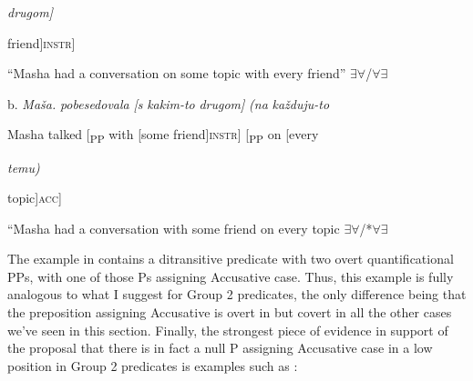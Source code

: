 \documentclass[output=paper,modfonts, nonflat]{langsci/langscibook}
\begin{document}
\begin{styleinnerExample}
\begin{styleinnerExample}
    \textit{drugom]}
\end{styleinnerExample}

\begin{styleinnerExample}
    friend]\textsc{instr}]
\end{styleinnerExample}

\begin{styleinnerExample}
    “Masha had a conversation on some topic with every friend” ${\exists}{\forall}$/${\forall}{\exists}$
\end{styleinnerExample}

\begin{styleinnerExample}
  b.  \textit{Maša.}  \textit{pobesedovala} \textit{[s}       \textit{kakim-to} \textit{drugom]}            \textit{(na} \textit{každuju-to} 
\end{styleinnerExample}

\begin{styleinnerExample}
    Masha talked         [\textsubscript{PP} with [some      friend]\textsc{instr}] [\textsubscript{PP} on [every 
\end{styleinnerExample}

\begin{styleinnerExample}
    \textit{temu)}
\end{styleinnerExample}

\begin{styleinnerExample}
    topic]\textsc{acc}]
\end{styleinnerExample}

\begin{styleinnerExample}
    “Masha had a conversation with some friend on every topic ${\exists}{\forall}$/*${\forall}{\exists}$
\end{styleinnerExample}

The example in  contains a ditransitive predicate with two overt quantificational PPs, with one of those Ps assigning Accusative case. Thus, this example is fully analogous to what I suggest for Group 2 predicates, the only difference being that the preposition assigning Accusative is overt in  but covert in all the other cases we’ve seen in this section. Finally, the strongest piece of evidence in support of the proposal that there is in fact a null P assigning Accusative case in a low position in Group 2 predicates is examples such as :

\begin{styleinnerExample}
\ea%
    \label{ex:key:54}
    \gll\\
        \\
    \glt
    \z


\end{styleinnerExample}
\end{styleinnerExample}
\end{document}
